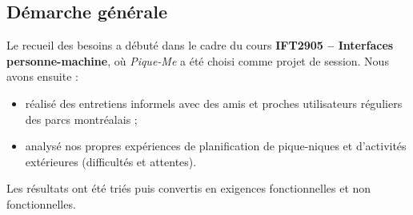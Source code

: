 \documentclass[12pt,a4paper]{article}
\begin{document}
\subsection{Démarche générale}
Le recueil des besoins a débuté dans le cadre du cours
\textbf{IFT2905 – Interfaces personne-machine}, où \emph{Pique-Me} a été
choisi comme projet de session. Nous avons ensuite :
\begin{itemize}
  \item réalisé des entretiens informels avec des amis et proches
        utilisateurs réguliers des parcs montréalais ;
  \item analysé nos propres expériences de planification de pique-niques
        et d'activités extérieures (difficultés et attentes).
\end{itemize}
Les résultats ont été triés puis convertis en
exigences fonctionnelles et non fonctionnelles.

\end{document}
